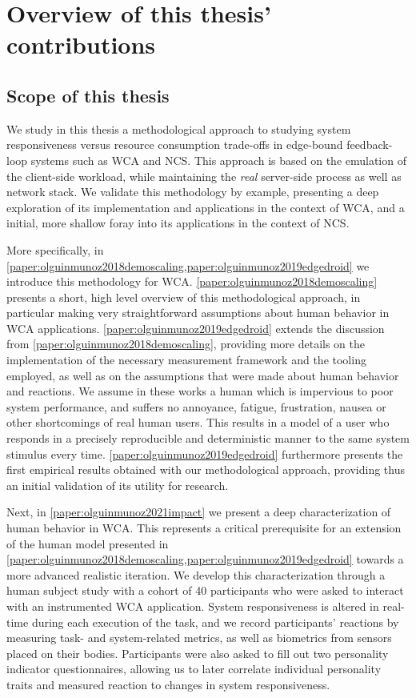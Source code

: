 \chapter{Overview of this thesis' contributions}


\section{Scope of this thesis}

We study in this thesis a methodological approach to studying system responsiveness versus resource consumption trade-offs in edge-bound feedback-loop systems such as \ac{WCA} and \ac{NCS}.
This approach is based on the emulation of the client-side workload, while maintaining the \emph{real} server-side process as well as network stack.
We validate this methodology by example, presenting a deep exploration of its implementation and applications in the context of \acl{WCA}, and a initial, more shallow foray into its applications in the context of \ac{NCS}.

More specifically, in \cref{paper:olguinmunoz2018demoscaling,paper:olguinmunoz2019edgedroid} we introduce this methodology for \ac{WCA}.
\cref{paper:olguinmunoz2018demoscaling} presents a short, high level overview of this methodological approach, in particular making very straightforward assumptions about human behavior in \ac{WCA} applications.
\cref{paper:olguinmunoz2019edgedroid} extends the discussion from \cref{paper:olguinmunoz2018demoscaling}, providing more details on the implementation of the necessary measurement framework and the tooling employed, as well as on the assumptions that were made about human behavior and reactions.
We assume in these works a human which is impervious to poor system performance, and suffers no annoyance, fatigue, frustration, nausea or other shortcomings of real human users.
This results in a model of a user who responds in a precisely reproducible and deterministic manner to the same system stimulus every time.
\cref{paper:olguinmunoz2019edgedroid} furthermore presents the first empirical results obtained with our methodological approach, providing thus an initial validation of its utility for research.

Next, in \cref{paper:olguinmunoz2021impact} we present a deep characterization of human behavior in \ac{WCA}.
This represents a critical prerequisite for an extension of the human model presented in \cref{paper:olguinmunoz2018demoscaling,paper:olguinmunoz2019edgedroid} towards a more advanced realistic iteration.
We develop this characterization through a human subject study with a cohort of \num{40} participants who were asked to interact with an instrumented \ac{WCA} application.
System responsiveness is altered in real-time during each execution of the task, and we record participants' reactions by measuring task- and system-related metrics, as well as biometrics from sensors placed on their bodies.
Participants were also asked to fill out two personality indicator questionnaires, allowing us to later correlate individual personality traits and measured reaction to changes in system responsiveness.

